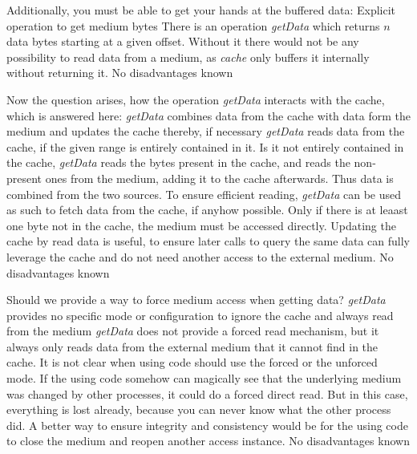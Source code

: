 Additionally, you must be able to get your hands at the buffered data:
{%
Explicit operation to get medium bytes
}
{%
There is an operation \emph{getData} which returns $n$ data bytes starting at a given offset.
}
{%
Without it there would not be any possibility to read data from a medium, as \emph{cache} only buffers it internally without returning it.
}
{%
No disadvantages known
}

Now the question arises, how the operation \emph{getData} interacts with the cache, which is answered here:
{%
\emph{getData} combines data from the cache with data form the medium and updates the cache thereby, if necessary
}
{%
\emph{getData} reads data from the cache, if the given range is entirely contained in it. Is it not entirely contained in the cache, \emph{getData} reads the bytes present in the cache, and reads the non-present ones from the medium, adding it to the cache afterwards. Thus data is combined from the two sources.
}
{%
To ensure efficient reading, \emph{getData} can be used as such to fetch data from the cache, if anyhow possible. Only if there is at leaast one byte not in the cache, the medium must be accessed directly. Updating the cache by read data is useful, to ensure later calls to query the same data can fully leverage the cache and do not need another access to the external medium.
}
{%
No disadvantages known
}

Should we provide a way to force medium access when getting data?
{%
\emph{getData} provides no specific mode or configuration to ignore the cache and always read from the medium
}
{%
\emph{getData} does not provide a forced read mechanism, but it always only reads data from the external medium that it cannot find in the cache.
}
{%
It is not clear when using code should use the forced or the unforced mode. If the using code somehow can magically see that the underlying medium was changed by other processes, it could do a forced direct read. But in this case, everything is lost already, because you can never know what the other process did. A better way to ensure integrity and consistency would be for the using code to close the medium and reopen another access instance.
}
{%
No disadvantages known
}

